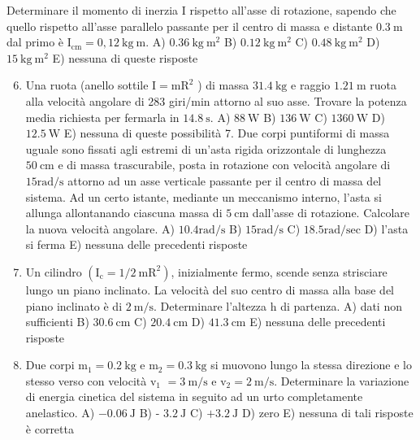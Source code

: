 \documentclass[10pt]{article}
\begin{document}
Determinare il momento di inerzia I rispetto all'asse di rotazione, sapendo che quello rispetto all'asse parallelo passante per il centro di massa e distante \(0.3 \mathrm{~m}\) dal primo è \(\mathrm{I}_{\mathrm{cm}}=0,12 \mathrm{~kg} \mathrm{~m}\).
A) \(0.36 \mathrm{~kg} \mathrm{~m}^{2}\)
B) \(0.12 \mathrm{~kg} \mathrm{~m}^{2}\)
C) \(0.48 \mathrm{~kg} \mathrm{~m}^{2}\)
D) \(15 \mathrm{~kg} \mathrm{~m}^{2}\)
E) nessuna di queste risposte

\begin{enumerate}
  \setcounter{enumi}{5}
  \item Una ruota (anello sottile \(\mathrm{I}=\mathrm{mR}^{2}\) ) di massa \(31.4 \mathrm{~kg}\) e raggio \(1.21 \mathrm{~m}\) ruota alla velocità angolare di 283 giri/min attorno al suo asse. Trovare la potenza media richiesta per fermarla in \(14.8 \mathrm{~s}\).
A) \(88 \mathrm{~W}\)
B) \(136 \mathrm{~W}\)
C) \(1360 \mathrm{~W}\)
D) \(12.5 \mathrm{~W}\)
E) nessuna di queste possibilità 7. Due corpi puntiformi di massa uguale sono fissati agli estremi di un'asta rigida orizzontale di lunghezza \(50 \mathrm{~cm}\) e di massa trascurabile, posta in rotazione con velocità angolare di \(15 \mathrm{rad} / \mathrm{s}\) attorno ad un asse verticale passante per il centro di massa del sistema. Ad un certo istante, mediante un meccanismo interno, l'asta si allunga allontanando ciascuna massa di \(5 \mathrm{~cm}\) dall'asse di rotazione. Calcolare la nuova velocità angolare.
A) \(10.4 \mathrm{rad} / \mathrm{s}\)
B) \(15 \mathrm{rad} / \mathrm{s}\)
C) \(18.5 \mathrm{rad} / \mathrm{sec}\)
D) l'asta si ferma
E) nessuna delle precedenti risposte

  \item Un cilindro \(\left(\mathrm{I}_{\mathrm{c}}=1 / 2 \mathrm{~m} \mathrm{R}^{2}\right)\), inizialmente fermo, scende senza strisciare lungo un piano inclinato. La velocità del suo centro di massa alla base del piano inclinato è di \(2 \mathrm{~m} / \mathrm{s}\). Determinare l'altezza h di partenza.
A) dati non sufficienti
B) \(30.6 \mathrm{~cm}\)
C) \(20.4 \mathrm{~cm}\)
D) \(41.3 \mathrm{~cm}\)
E) nessuna delle precedenti risposte

  \item Due corpi \(\mathrm{m}_{1}=0.2 \mathrm{~kg}\) e \(\mathrm{m}_{2}=0.3 \mathrm{~kg}\) si muovono lungo la stessa direzione e lo stesso verso con velocità \(\mathrm{v}_{1}\) \(=3 \mathrm{~m} / \mathrm{s}\) e \(\mathrm{v}_{2}=2 \mathrm{~m} / \mathrm{s}\). Determinare la variazione di energia cinetica del sistema in seguito ad un urto completamente anelastico.
A) \(-0.06 \mathrm{~J}\)
B) - \(3.2 \mathrm{~J}\)
C) \(+3.2 \mathrm{~J}\)
D) zero
E) nessuna di tali risposte è corretta


\end{enumerate}
\end{document}
